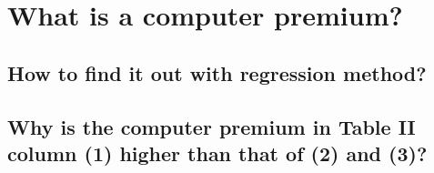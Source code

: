 
\chapter{What is a computer premium?}
\label{chap:part2}

\section{How to find it out with regression method?}

\section{Why is the
computer premium in Table II column (1) higher than that of (2) and (3)?}